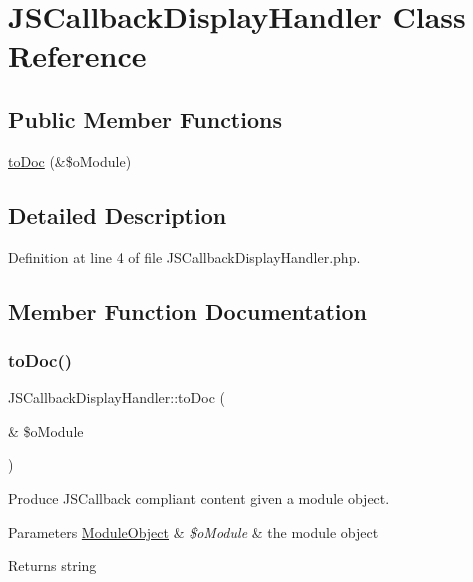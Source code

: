 \hypertarget{classJSCallbackDisplayHandler}{}\section{J\+S\+Callback\+Display\+Handler Class Reference}
\label{classJSCallbackDisplayHandler}
\subsection*{Public Member Functions}
\begin{DoxyCompactItemize}
\item 
\hyperlink{classJSCallbackDisplayHandler_af9bbdda903e76c61d097bc20aecc73d5}{to\+Doc} (\&\$o\+Module)
\end{DoxyCompactItemize}


\subsection{Detailed Description}


Definition at line 4 of file J\+S\+Callback\+Display\+Handler.\+php.



\subsection{Member Function Documentation}
\mbox{\label{classJSCallbackDisplayHandler_af9bbdda903e76c61d097bc20aecc73d5}} 
\subsubsection{\texorpdfstring{to\+Doc()}{toDoc()}}
{\footnotesize\ttfamily J\+S\+Callback\+Display\+Handler\+::to\+Doc (\begin{DoxyParamCaption}\item[{\&}]{\$o\+Module }\end{DoxyParamCaption})}

Produce J\+S\+Callback compliant content given a module object.~\newline

\begin{DoxyParams}[1]{Parameters}
\hyperlink{classModuleObject}{Module\+Object} & {\em \$o\+Module} & the module object \\
\hline
\end{DoxyParams}
\begin{DoxyReturn}{Returns}
string 
\end{DoxyReturn}


